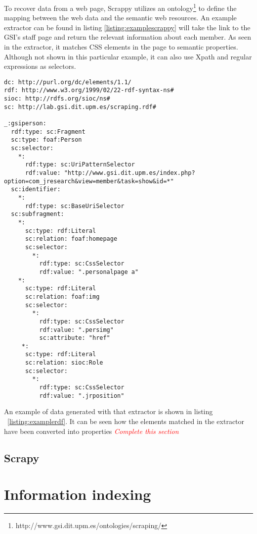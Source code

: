 To recover data from a web page, Scrappy utilizes an ontology\footnote{http://www.gsi.dit.upm.es/ontologies/scraping/} to define the mapping between the web data and the semantic web resources. An example extractor can be found in listing \ref{listing:examplescrappy} will take the link to the GSI's staff page and return the relevant information about each member. As seen in the extractor, it matches CSS elements in the page to semantic properties. Although not shown in this particular example, it can also use Xpath and regular expressions as selectors.

\begin{center} 
  \begin{lstlisting}[language={}, captionpos=b, caption=Example extractor, label=listing:examplescrappy]   
dc: http://purl.org/dc/elements/1.1/
rdf: http://www.w3.org/1999/02/22-rdf-syntax-ns#
sioc: http://rdfs.org/sioc/ns#
sc: http://lab.gsi.dit.upm.es/scraping.rdf#

_:gsiperson:
  rdf:type: sc:Fragment
  sc:type: foaf:Person
  sc:selector:
    *:
      rdf:type: sc:UriPatternSelector
      rdf:value: "http://www.gsi.dit.upm.es/index.php?option=com_jresearch&view=member&task=show&id=*" 
  sc:identifier:
    *:
      rdf:type: sc:BaseUriSelector
  sc:subfragment:
    *:
      sc:type: rdf:Literal
      sc:relation: foaf:homepage
      sc:selector:
        *:
          rdf:type: sc:CssSelector
          rdf:value: ".personalpage a"
    *:
      sc:type: rdf:Literal
      sc:relation: foaf:img
      sc:selector:
        *:
          rdf:type: sc:CssSelector
          rdf:value: ".persimg"
          sc:attribute: "href"
     *:
      sc:type: rdf:Literal
      sc:relation: sioc:Role
      sc:selector:
        *:
          rdf:type: sc:CssSelector
          rdf:value: ".jrposition"
  \end{lstlisting}
\end{center}

An example of data generated with that extractor is shown in listing ~\ref{listing:examplerdf}. It can be seen how the elements matched in the extractor have been converted into properties
\emph{\textcolor{red}{Complete this section}}

\begin{center}
  
\end{center}

\subsection{Scrapy}


\section{Information indexing}

